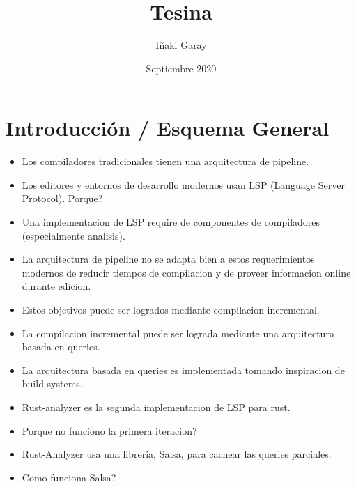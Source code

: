 \documentclass[12pt, a4paper]{report}
\title{Tesina}
\author{Iñaki Garay}
\date{Septiembre 2020}
\begin{document}
\begin{titlepage}
\maketitle
\thispagestyle{empty}
\end{titlepage}

\tableofcontents
\thispagestyle{empty}

\newpage

\section*{Introducción / Esquema General}

\begin{itemize}[noitemsep]

\item Los compiladores tradicionales tienen una arquitectura de pipeline.

\item Los editores y entornos de desarrollo modernos usan LSP (Language Server
Protocol). Porque?

\item Una implementacion de LSP require de componentes de compiladores
(especialmente analisis).

\item La arquitectura de pipeline no se adapta bien a estos requerimientos
modernos de reducir tiempos de compilacion y de proveer informacion online
durante edicion.

\item Estos objetivos puede ser logrados mediante compilacion incremental.

\item La compilacion incremental puede ser lograda mediante una arquitectura
basada en queries.

\item La arquitectura basada en queries es implementada tomando inspiracion de
build systems.

\item Rust-analyzer es la segunda implementacion de LSP para rust.

\item Porque no funciono la primera iteracion?

\item Rust-Analyzer usa una libreria, Salsa, para cachear las queries parciales.

\item Como funciona Salsa?

\end{itemize}
\end{document}
